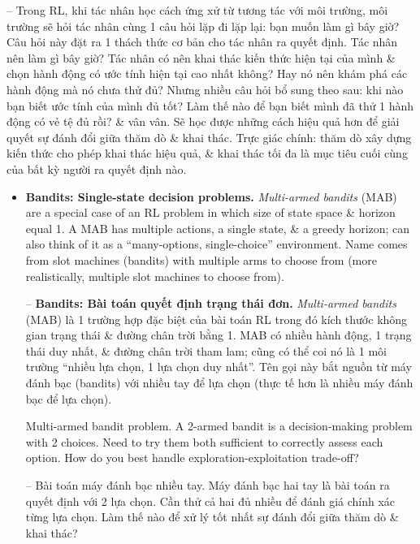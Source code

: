 \documentclass{article}
\begin{document}
\begin{itemize}
\begin{itemize}
        -- Trong RL, khi tác nhân học cách ứng xử từ tương tác với môi trường, môi trường sẽ hỏi tác nhân cùng 1 câu hỏi lặp đi lặp lại: bạn muốn làm gì bây giờ? Câu hỏi này đặt ra 1 thách thức cơ bản cho tác nhân ra quyết định. Tác nhân nên làm gì bây giờ? Tác nhân có nên khai thác kiến thức hiện tại của mình \& chọn hành động có ước tính hiện tại cao nhất không? Hay nó nên khám phá các hành động mà nó chưa thử đủ? Nhưng nhiều câu hỏi bổ sung theo sau: khi nào bạn biết ước tính của mình đủ tốt? Làm thế nào để bạn biết mình đã thử 1 hành động có vẻ tệ đủ rồi? \& vân vân. Sẽ học được những cách hiệu quả hơn để giải quyết sự đánh đổi giữa thăm dò \& khai thác. Trực giác chính: thăm dò xây dựng kiến thức cho phép khai thác hiệu quả, \& khai thác tối đa là mục tiêu cuối cùng của bất kỳ người ra quyết định nào.
        \begin{itemize}
            \item {\bf Bandits: Single-state decision problems.} {\it Multi-armed bandits} (MAB) are a special case of an RL problem in which size of state space \& horizon equal 1. A MAB has multiple actions, a single state, \& a greedy horizon; can also think of it as a ``many-options, single-choice'' environment. Name comes from slot machines (bandits) with multiple arms to choose from (more realistically, multiple slot machines to choose from).

            -- {\bf Bandits: Bài toán quyết định trạng thái đơn.} {\it Multi-armed bandits} (MAB) là 1 trường hợp đặc biệt của bài toán RL trong đó kích thước không gian trạng thái \& đường chân trời bằng 1. MAB có nhiều hành động, 1 trạng thái duy nhất, \& đường chân trời tham lam; cũng có thể coi nó là 1 môi trường ``nhiều lựa chọn, 1 lựa chọn duy nhất''. Tên gọi này bắt nguồn từ máy đánh bạc (bandits) với nhiều tay để lựa chọn (thực tế hơn là nhiều máy đánh bạc để lựa chọn).

            {\sf Multi-armed bandit problem.} A 2-armed bandit is a decision-making problem with 2 choices. Need to try them both sufficient to correctly assess each option. How do you best handle exploration-exploitation trade-off?

            -- {\sf Bài toán máy đánh bạc nhiều tay.} Máy đánh bạc hai tay là bài toán ra quyết định với 2 lựa chọn. Cần thử cả hai đủ nhiều để đánh giá chính xác từng lựa chọn. Làm thế nào để xử lý tốt nhất sự đánh đổi giữa thăm dò \& khai thác?


\end{itemize}
\end{itemize}
\end{itemize}
\end{document}
